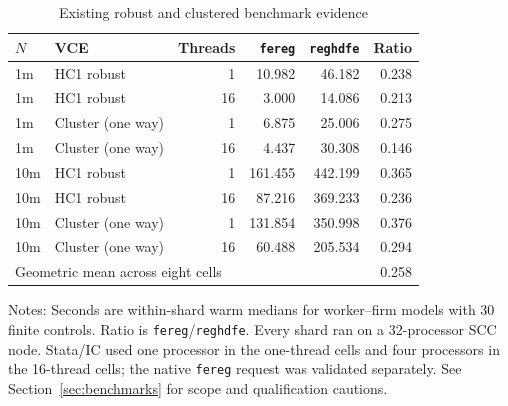 \begin{table}[tbp]
\centering
\caption{Existing robust and clustered benchmark evidence}
\label{tab:bench-vce}
\small
\begin{threeparttable}
\begin{tabular}{llrrrr}
\toprule
$N$ & VCE & Threads & \texttt{fereg} & \texttt{reghdfe} & Ratio \\
\midrule
1m & HC1 robust & 1 & 10.982 & 46.182 & 0.238 \\
1m & HC1 robust & 16 & 3.000 & 14.086 & 0.213 \\
1m & Cluster (one way) & 1 & 6.875 & 25.006 & 0.275 \\
1m & Cluster (one way) & 16 & 4.437 & 30.308 & 0.146 \\
10m & HC1 robust & 1 & 161.455 & 442.199 & 0.365 \\
10m & HC1 robust & 16 & 87.216 & 369.233 & 0.236 \\
10m & Cluster (one way) & 1 & 131.854 & 350.998 & 0.376 \\
10m & Cluster (one way) & 16 & 60.488 & 205.534 & 0.294 \\
\midrule
\multicolumn{5}{l}{Geometric mean across eight cells} & 0.258 \\
\bottomrule
\end{tabular}
\begin{tablenotes}[flushleft]\footnotesize
\item Notes: Seconds are within-shard warm medians for worker--firm models with 30 finite controls. Ratio is \texttt{fereg}/\texttt{reghdfe}. Every shard ran on a 32-processor SCC node. Stata/IC used one processor in the one-thread cells and four processors in the 16-thread cells; the native \texttt{fereg} request was validated separately. See Section~\ref{sec:benchmarks} for scope and qualification cautions.
\end{tablenotes}
\end{threeparttable}
\end{table}
